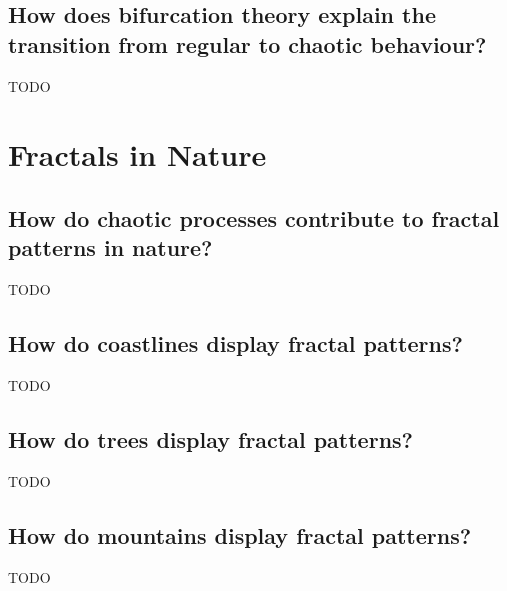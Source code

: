 \documentclass[12pt]{article}
\begin{document}
\subsection{How does bifurcation theory explain the transition from regular to chaotic behaviour?}
TODO

\section{Fractals in Nature}
\subsection{How do chaotic processes contribute to fractal patterns in nature?}
TODO

\subsection{How do coastlines display fractal patterns?}
TODO

\subsection{How do trees display fractal patterns?}
TODO

\subsection{How do mountains display fractal patterns?}
TODO
\end{document}
